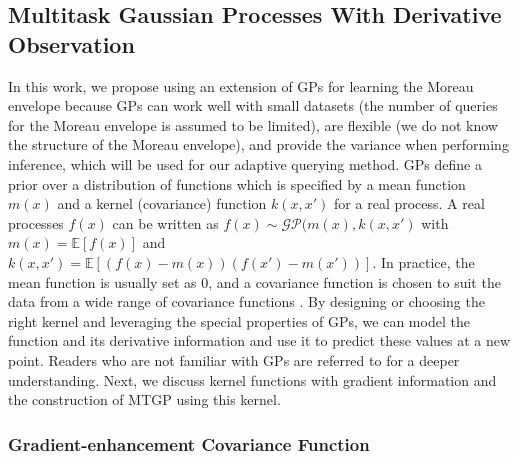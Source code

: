 \documentclass[conference]{IEEEtran}
\newcommand{\AD}[1]{}
\begin{document}
\subsection{Multitask Gaussian Processes With Derivative Observation}


In this work, we propose using an extension of GPs for learning the Moreau envelope because GPs can work well with small datasets (the number of queries for the Moreau envelope is assumed to be limited), are flexible (we do not know the structure of the Moreau envelope), and provide the variance when performing inference, which will be used for our adaptive querying method.  
GPs define a prior over a distribution of functions which is specified by a mean function $m(x)$ and a kernel (covariance) function $k(x,x')$ for a real process. 
A real processes $f(x)$ can be written as $f(x) \sim \mathcal{GP}(m(x),k(x,x')$ with $m(x) = \mathbb{E}[f(x)]$ and $k(x,x') = \mathbb{E}[(f(x) - m(x))(f(x')- m(x'))]$. In practice, the mean function is usually set as $0$, and a covariance function is chosen to suit the data from a wide range of covariance functions \cite{duvenaud_2014}. By designing or choosing the right kernel and leveraging the special properties of GPs, we can model the function and its derivative information and use it to predict these values at a new point. 
Readers who are not familiar with GPs are referred to \cite{williams2006gaussian} for a deeper understanding. 
Next, we discuss kernel functions with gradient information and the construction of MTGP using this kernel.

\subsubsection{Gradient-enhancement Covariance Function}
\end{document}
